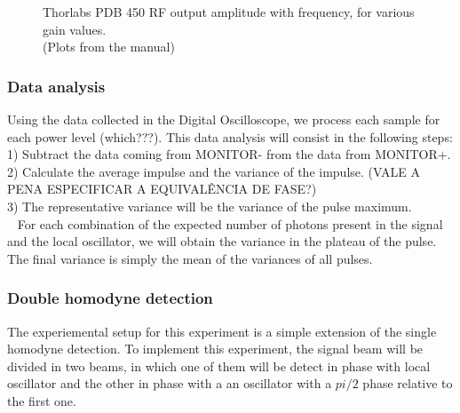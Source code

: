 \begin{bibunit}[plain]
\begin{figure}[H]
	\caption{Thorlabs PDB 450 RF output amplitude with frequency, for various gain values.\\(Plots from the manual)}
\end{figure}
\subsubsection{Data analysis}
%
Using the data collected in the Digital Oscilloscope, we process each sample for each power level (which???).
This data analysis will consist in the following steps:
1) Subtract the data coming from MONITOR- from the data from MONITOR+.\\
2) Calculate the average impulse and the variance of the impulse. (VALE A PENA ESPECIFICAR A EQUIVALÊNCIA DE FASE?)\\
3) The representative variance will be the variance of the pulse maximum.\\\
%
For each combination of the expected number of photons present in the signal and the local oscillator, we will obtain the variance in the plateau of the pulse. The final variance is simply the mean of the variances of all pulses.
%

\subsubsection{Double homodyne detection}
%
The experiemental setup for this experiment is a simple extension of the single homodyne detection. To implement this experiment, the signal beam will be divided in two beams, in which one of them will be detect in phase with local oscillator and the other in phase with a an oscillator with a $pi/2$ phase relative to the first one.
%


\end{bibunit}
